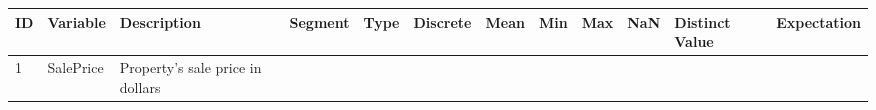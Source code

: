 \documentclass[11pt]{article}
\begin{document}
\begin{longtable}[]{@{}llllllllllll@{}}
\toprule
\begin{minipage}[b]{0.04\columnwidth}\raggedright\strut
ID\strut
\end{minipage} & \begin{minipage}[b]{0.04\columnwidth}\raggedright\strut
Variable\strut
\end{minipage} & \begin{minipage}[b]{0.04\columnwidth}\raggedright\strut
Description\strut
\end{minipage} & \begin{minipage}[b]{0.04\columnwidth}\raggedright\strut
Segment\strut
\end{minipage} & \begin{minipage}[b]{0.04\columnwidth}\raggedright\strut
Type\strut
\end{minipage} & \begin{minipage}[b]{0.04\columnwidth}\raggedright\strut
Discrete\strut
\end{minipage} & \begin{minipage}[b]{0.04\columnwidth}\raggedright\strut
Mean\strut
\end{minipage} & \begin{minipage}[b]{0.04\columnwidth}\raggedright\strut
Min\strut
\end{minipage} & \begin{minipage}[b]{0.04\columnwidth}\raggedright\strut
Max\strut
\end{minipage} & \begin{minipage}[b]{0.04\columnwidth}\raggedright\strut
NaN\strut
\end{minipage} & \begin{minipage}[b]{0.04\columnwidth}\raggedright\strut
Distinct Value\strut
\end{minipage} & \begin{minipage}[b]{0.04\columnwidth}\raggedright\strut
Expectation\strut
\end{minipage}\tabularnewline
\midrule
\endhead
\begin{minipage}[t]{0.04\columnwidth}\raggedright\strut
1\strut
\end{minipage} & \begin{minipage}[t]{0.04\columnwidth}\raggedright\strut
SalePrice\strut
\end{minipage} & \begin{minipage}[t]{0.04\columnwidth}\raggedright\strut
Property's sale price in dollars\strut
\end{minipage} & \begin{minipage}[t]{0.04\columnwidth}\raggedright\strut

\end{minipage}
\end{longtable}
\end{document}
